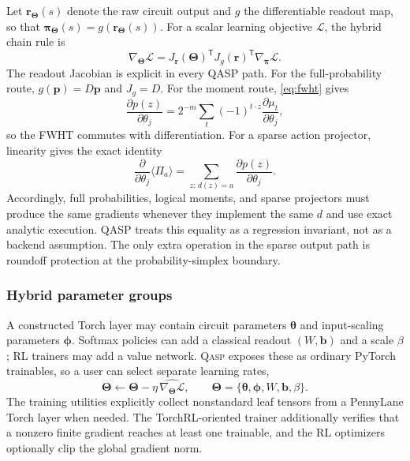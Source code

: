 \documentclass[10pt]{article}
\newcommand{\qasp}{\textsc{Qasp}}
\begin{document}
Let $\bm r_{\bm\Theta}(s)$ denote the raw circuit output and
$g$ the differentiable readout map, so that
$\bm\pi_{\bm\Theta}(s)=g(\bm r_{\bm\Theta}(s))$.  For a scalar learning
objective $\mathcal L$, the hybrid chain rule is
\begin{equation}
  \nabla_{\bm\Theta}\mathcal L
  =J_{\bm r}(\bm\Theta)^{\mathsf T}
   J_g(\bm r)^{\mathsf T}
   \nabla_{\bm\pi}\mathcal L.
  \label{eq:readout-chain-rule}
\end{equation}
The readout Jacobian is explicit in every QASP path.  For the full-probability
route, $g(\bm p)=D\bm p$ and $J_g=D$.  For the moment route,
\cref{eq:fwht} gives
\begin{equation}
  \frac{\partial p(z)}{\partial\theta_j}
  =2^{-m}\sum_t(-1)^{t\cdot z}
    \frac{\partial\mu_t}{\partial\theta_j},
  \label{eq:moment-gradient}
\end{equation}
so the FWHT commutes with differentiation.  For a sparse action projector,
linearity gives the exact identity
\begin{equation}
  \frac{\partial}{\partial\theta_j}\langle\Pi_a\rangle
  =\sum_{z:\,d(z)=a}
    \frac{\partial p(z)}{\partial\theta_j}.
  \label{eq:projector-gradient-equivalence}
\end{equation}
Accordingly, full probabilities, logical moments, and sparse projectors must
produce the same gradients whenever they implement the same $d$ and use exact
analytic execution.  QASP treats this equality as a regression invariant, not
as a backend assumption.  The only extra operation in the sparse output path
is roundoff protection at the probability-simplex boundary.

\subsubsection{Hybrid parameter groups}

A constructed Torch layer may contain circuit parameters $\bm{\theta}$ and input-scaling parameters $\bm{\phi}$.  Softmax policies can add a classical readout $(W,\bm{b})$ and a scale $\beta$; RL trainers may add a value network.  \qasp{} exposes these as ordinary PyTorch trainables, so a user can select separate learning rates,
\begin{equation}
  \bm{\Theta}\leftarrow
  \bm{\Theta}-\eta\,\widehat{\nabla_{\bm{\Theta}}\mathcal{L}},
  \qquad
  \bm{\Theta}=\{\bm{\theta},\bm{\phi},W,\bm{b},\beta\}.
\end{equation}
The training utilities explicitly collect nonstandard leaf tensors from a PennyLane Torch layer when needed.  The TorchRL-oriented trainer additionally verifies that a nonzero finite gradient reaches at least one trainable, and the RL optimizers optionally clip the global gradient norm.
\end{document}

